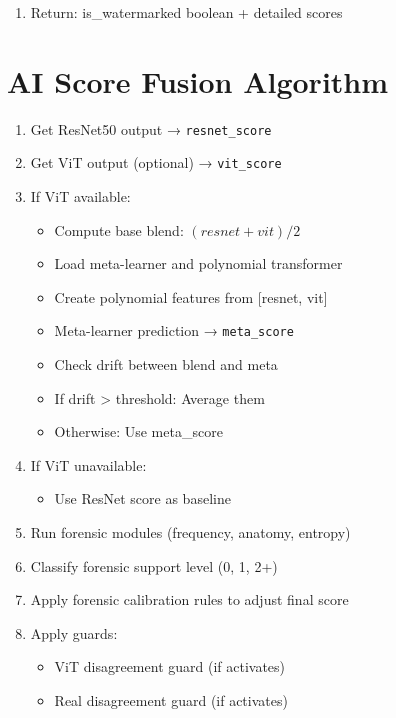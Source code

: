 \documentclass[12pt,a4paper]{book}
\begin{document}
\begin{itemize}
\begin{enumerate}
    \item Return: is\_watermarked boolean + detailed scores
\end{enumerate}

\section{AI Score Fusion Algorithm}

\begin{enumerate}
    \item Get ResNet50 output → \texttt{resnet\_score}
    
    \item Get ViT output (optional) → \texttt{vit\_score}
    
    \item If ViT available:
    \begin{itemize}
        \item Compute base blend: $(resnet + vit) / 2$
        \item Load meta-learner and polynomial transformer
        \item Create polynomial features from [resnet, vit]
        \item Meta-learner prediction → \texttt{meta\_score}
        \item Check drift between blend and meta
        \item If drift > threshold: Average them
        \item Otherwise: Use meta\_score
    \end{itemize}
    
    \item If ViT unavailable:
    \begin{itemize}
        \item Use ResNet score as baseline
    \end{itemize}
    
    \item Run forensic modules (frequency, anatomy, entropy)
    
    \item Classify forensic support level (0, 1, 2+)
    
    \item Apply forensic calibration rules to adjust final score
    
    \item Apply guards:
    \begin{itemize}
        \item ViT disagreement guard (if activates)
        \item Real disagreement guard (if activates)
    \end{itemize}
    

\end{enumerate}
\end{itemize}
\end{document}
